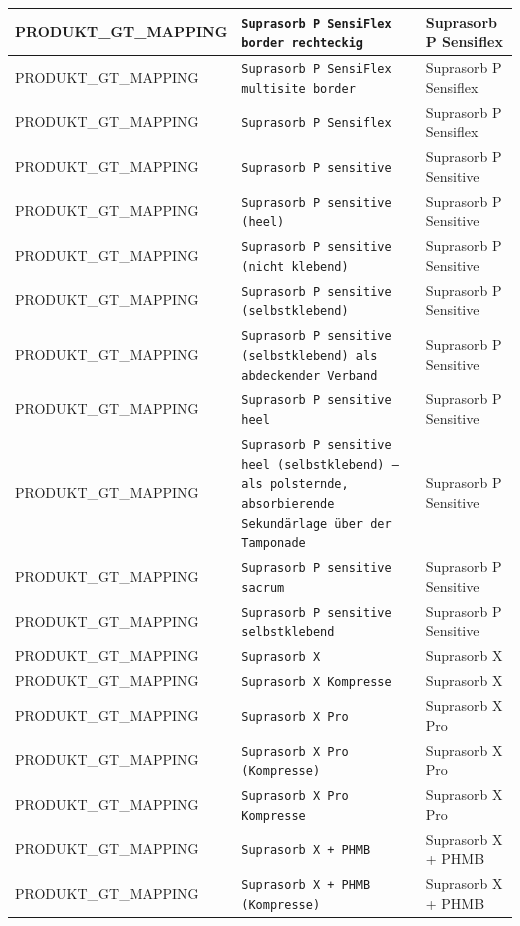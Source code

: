 \begin{longtable}{|p{3.5cm}|p{5cm}|p{6.5cm}|}
PRODUKT\_GT\_MAPPING & \texttt{Suprasorb P SensiFlex border rechteckig} & Suprasorb P Sensiflex \\ \hline
PRODUKT\_GT\_MAPPING & \texttt{Suprasorb P SensiFlex multisite border} & Suprasorb P Sensiflex \\ \hline
PRODUKT\_GT\_MAPPING & \texttt{Suprasorb P Sensiflex} & Suprasorb P Sensiflex \\ \hline
PRODUKT\_GT\_MAPPING & \texttt{Suprasorb P sensitive} & Suprasorb P Sensitive \\ \hline
PRODUKT\_GT\_MAPPING & \texttt{Suprasorb P sensitive (heel)} & Suprasorb P Sensitive \\ \hline
PRODUKT\_GT\_MAPPING & \texttt{Suprasorb P sensitive (nicht klebend)} & Suprasorb P Sensitive \\ \hline
PRODUKT\_GT\_MAPPING & \texttt{Suprasorb P sensitive (selbstklebend)} & Suprasorb P Sensitive \\ \hline
PRODUKT\_GT\_MAPPING & \texttt{Suprasorb P sensitive (selbstklebend) als abdeckender Verband} & Suprasorb P Sensitive \\ \hline
PRODUKT\_GT\_MAPPING & \texttt{Suprasorb P sensitive heel} & Suprasorb P Sensitive \\ \hline
PRODUKT\_GT\_MAPPING & \texttt{Suprasorb P sensitive heel (selbstklebend) – als polsternde, absorbierende Sekundärlage über der Tamponade} & Suprasorb P Sensitive \\ \hline
PRODUKT\_GT\_MAPPING & \texttt{Suprasorb P sensitive sacrum} & Suprasorb P Sensitive \\ \hline
PRODUKT\_GT\_MAPPING & \texttt{Suprasorb P sensitive selbstklebend} & Suprasorb P Sensitive \\ \hline
PRODUKT\_GT\_MAPPING & \texttt{Suprasorb X} & Suprasorb X \\ \hline
PRODUKT\_GT\_MAPPING & \texttt{Suprasorb X Kompresse} & Suprasorb X \\ \hline
PRODUKT\_GT\_MAPPING & \texttt{Suprasorb X Pro} & Suprasorb X Pro \\ \hline
PRODUKT\_GT\_MAPPING & \texttt{Suprasorb X Pro (Kompresse)} & Suprasorb X Pro \\ \hline
PRODUKT\_GT\_MAPPING & \texttt{Suprasorb X Pro Kompresse} & Suprasorb X Pro \\ \hline
PRODUKT\_GT\_MAPPING & \texttt{Suprasorb X + PHMB} & Suprasorb X + PHMB \\ \hline
PRODUKT\_GT\_MAPPING & \texttt{Suprasorb X + PHMB (Kompresse)} & Suprasorb X + PHMB \\ \hline

\end{longtable}
